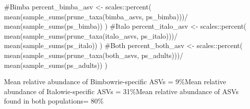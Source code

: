 \documentclass[
  letterpaper,
  DIV=11,
  numbers=noendperiod]{scrartcl}
\newenvironment{Shaded}{\begin{snugshade}}{\end{snugshade}}
\newcommand{\CommentTok}[1]{\textcolor[rgb]{0.37,0.37,0.37}{#1}}
\newcommand{\FunctionTok}[1]{\textcolor[rgb]{0.28,0.35,0.67}{#1}}
\newcommand{\NormalTok}[1]{\textcolor[rgb]{0.00,0.23,0.31}{#1}}
\newcommand{\OtherTok}[1]{\textcolor[rgb]{0.00,0.23,0.31}{#1}}
\newcommand{\SpecialCharTok}[1]{\textcolor[rgb]{0.37,0.37,0.37}{#1}}
\begin{document}
\begin{Shaded}
\begin{Highlighting}[]
\CommentTok{\#Bimba}
\NormalTok{percent\_bimba\_asv }\OtherTok{\textless{}{-}}\NormalTok{ scales}\SpecialCharTok{::}\FunctionTok{percent}\NormalTok{(}
  \FunctionTok{mean}\NormalTok{(}\FunctionTok{sample\_sums}\NormalTok{(}\FunctionTok{prune\_taxa}\NormalTok{(bimba\_asvs, ps\_bimba)))}\SpecialCharTok{/}
  \FunctionTok{mean}\NormalTok{(}\FunctionTok{sample\_sums}\NormalTok{(ps\_bimba))}
\NormalTok{)}
\CommentTok{\#Italo}
\NormalTok{percent\_italo\_asv }\OtherTok{\textless{}{-}}\NormalTok{ scales}\SpecialCharTok{::}\FunctionTok{percent}\NormalTok{(}
  \FunctionTok{mean}\NormalTok{(}\FunctionTok{sample\_sums}\NormalTok{(}\FunctionTok{prune\_taxa}\NormalTok{(italo\_asvs, ps\_italo)))}\SpecialCharTok{/}
  \FunctionTok{mean}\NormalTok{(}\FunctionTok{sample\_sums}\NormalTok{(ps\_italo))}
\NormalTok{)}
\CommentTok{\#Both}
\NormalTok{percent\_both\_asv }\OtherTok{\textless{}{-}}\NormalTok{ scales}\SpecialCharTok{::}\FunctionTok{percent}\NormalTok{(}
  \FunctionTok{mean}\NormalTok{(}\FunctionTok{sample\_sums}\NormalTok{(}\FunctionTok{prune\_taxa}\NormalTok{(both\_asvs, ps\_adults)))}\SpecialCharTok{/}
  \FunctionTok{mean}\NormalTok{(}\FunctionTok{sample\_sums}\NormalTok{(ps\_adults))}
\NormalTok{)}
\end{Highlighting}
\end{Shaded}

Mean relative abundance of Bimbowrie-specific ASVs = 9\%Mean relative
abundance of Italowie-specific ASVs = 31\%Mean relative abundance of
ASVs found in both populations= 80\%
\end{document}
